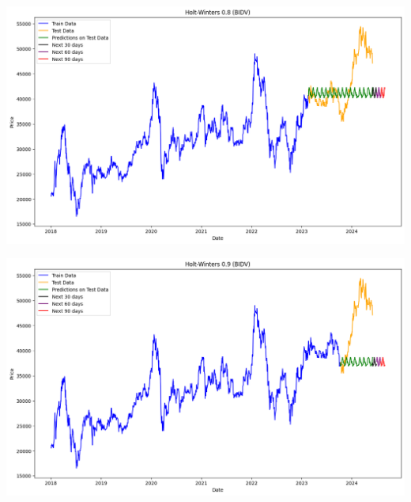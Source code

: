 \documentclass[conference]{IEEEtran}
\begin{document}
\begin{minipage}{0.23\textwidth}
    \centering
    \includegraphics[width=\linewidth]{images/Holt Winter/HW_BIDV_82.png}
    \label{fig:image1}
\end{minipage}
\hfill
\begin{minipage}{0.23\textwidth}
    \centering
    \includegraphics[width=\linewidth]{images/Holt Winter/HW_BIDV_91.png}
    \label{fig:image2}
\end{minipage}
\end{document}
